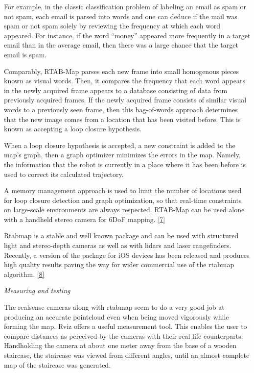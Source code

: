 \documentclass{article}
\begin{document}
For example, in the classic classification problem of labeling an email as spam or not spam, each email is parsed into words and one can deduce if the mail was spam or not spam solely by reviewing the frequency at which each word appeared. For instance, if the word “money” appeared more frequently in a target email than in the average email, then there was a large chance that the target email is spam.

Comparably, RTAB-Map parses each new frame into small homogenous pieces known as visual words. Then, it compares the frequency that each word appears in the newly acquired frame appears to a database consisting of data from previously acquired frames. If the newly acquired frame consists of similar visual words to a previously seen frame, then this bag-of-words approach determines that the new image comes from a location that has been visited before. This is known as accepting a loop closure hypothesis.

When a loop closure hypothesis is accepted, a new constraint is added to the map’s graph, then a graph optimizer minimizes the errors in the map. Namely, the information that the robot is currently in a place where it has been before is used to correct its calculated trajectory. 

A memory management approach is used to limit the number of locations used for loop closure detection and graph optimization, so that real-time constraints on large-scale environments are always respected. RTAB-Map can be used alone with a handheld stereo camera for 6DoF mapping. \href{http://introlab.github.io/rtabmap/}{[7]}

Rtabmap is a stable and well known package and can be used with structured light and stereo-depth cameras as well as with lidars and laser rangefinders. Recently, a version of the package for iOS devices has been released and produces high quality results paving the way for wider commercial use of the rtabmap algorithm. \href{https://www.youtube.com/watch?v=rVpIcrgD5c0}{[8]}

\newpage
\textit{Measuring and testing}
\bigskip

The realsense cameras along with rtabmap seem to do a very good job at producing an accurate pointcloud even when being moved vigorously while forming the map. Rviz offers a useful measurement tool. This enables the user to compare distances as perceived by the cameras with their real life counterparts. Handholding the camera at about one meter away from the base of a wooden staircase, the staircase was viewed from different angles, until an almost complete map of the staircase was generated. 
\end{document}
